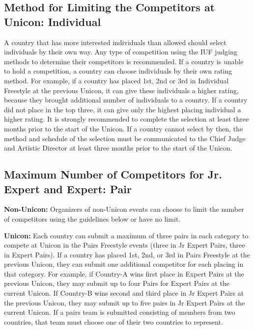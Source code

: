 \subsection{Method for Limiting the Competitors at Unicon: Individual} %
A country that has more interested individuals than allowed should select individuals by their own way.
Any type of competition using the IUF judging methods to determine their competitors is recommended.
If a country is unable to hold a competition, a country can choose individuals by their own rating method.
For example, if a country has placed 1st, 2nd or 3rd in Individual Freestyle at the previous Unicon, it can give these individuals a higher rating, because they brought additional number of individuals to a country.
If a country did not place in the top three, it can give only the highest placing individual a higher rating.
It is strongly recommended to complete the selection at least three months prior to the start of the Unicon.
If a country cannot select by then, the method and schedule of the selection must be communicated to the Chief Judge and Artistic Director at least three months prior to the start of the Unicon.

\subsection{Maximum Number of Competitors for Jr. Expert and Expert: Pair}
\textbf{Non-Unicon:} Organizers of non-Unicon events can choose to limit the number of competitors using the guidelines below or have no limit.

\textbf{Unicon:} Each country can submit a maximum of three pairs in each category to compete at Unicon in the Pairs Freestyle events (three in Jr Expert Pairs, three in Expert Pairs).
If a country has placed 1st, 2nd, or 3rd in Pairs Freestyle at the previous Unicon, they can submit one additional competitor for each placing in that category.
For example, if Country-A wins first place in Expert Pairs at the previous Unicon, they may submit up to four Pairs for Expert Pairs at the current Unicon.
If Country-B wins second and third place in Jr Expert Pairs at the previous Unicon, they may submit up to five pairs in Jr Expert Pairs at the current Unicon.
If a pairs team is submitted consisting of members from two countries, that team must choose one of their two countries to represent.

